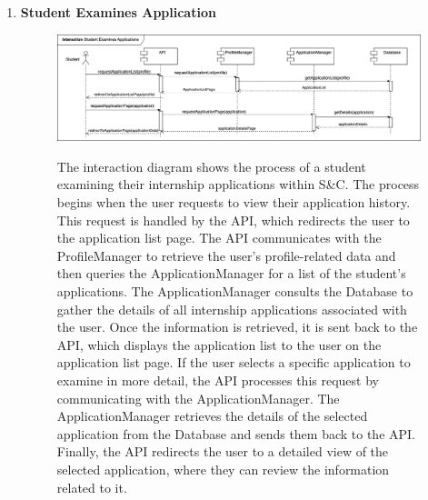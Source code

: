 \begin{enumerate}
    \newpage
    \item \textbf{Student Examines Application}
    \begin{figure}[h!]
            \centering  \includegraphics[width=1\textwidth]{DD/Images/Interactions/INT07_StudentExaminesApplications.drawio.png}
            \label{fig:ComponentViewDiagram}
            \caption*{The interaction diagram shows the process of a student examining their internship applications within S\&C. The process begins when the user requests to view their application history. This request is handled by the API, which redirects the user to the application list page. The API communicates with the ProfileManager to retrieve the user’s profile-related data and then queries the ApplicationManager for a list of the student’s applications.
            The ApplicationManager consults the Database to gather the details of all internship applications associated with the user. Once the information is retrieved, it is sent back to the API, which displays the application list to the user on the application list page.
            If the user selects a specific application to examine in more detail, the API processes this request by communicating with the ApplicationManager. The ApplicationManager retrieves the details of the selected application from the Database and sends them back to the API. Finally, the API redirects the user to a detailed view of the selected application, where they can review the information related to it.
            }
    \end{figure}


\end{enumerate}
